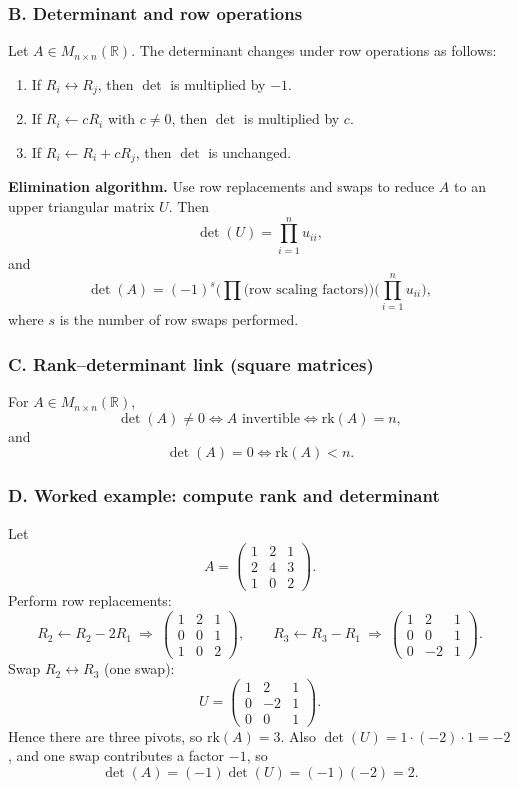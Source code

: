 \documentclass[12pt,a4paper]{article}
\theoremstyle{plain}
\theoremstyle{definition}      %
\begin{document}
\subsubsection*{B. Determinant and row operations}

Let $A\in M_{n\times n}(\mathbb R)$. The determinant changes under row operations as follows:
\begin{enumerate}
	\item If $R_i\leftrightarrow R_j$, then $\det$ is multiplied by $-1$.
	\item If $R_i\leftarrow cR_i$ with $c\neq 0$, then $\det$ is multiplied by $c$.
	\item If $R_i\leftarrow R_i+cR_j$, then $\det$ is unchanged.
\end{enumerate}

\medskip
\noindent\textbf{Elimination algorithm.}
Use row replacements and swaps to reduce $A$ to an upper triangular matrix $U$.
Then
\[
\det(U)=\prod_{i=1}^n u_{ii},
\]
and
\[
\det(A)=(-1)^{s}\Big(\prod \text{(row scaling factors)}\Big)\Big(\prod_{i=1}^n u_{ii}\Big),
\]
where $s$ is the number of row swaps performed.

\subsubsection*{C. Rank--determinant link (square matrices)}

For $A\in M_{n\times n}(\mathbb R)$,
\[
\det(A)\neq 0 \iff A \text{ invertible} \iff \mathrm{rk}(A)=n,
\]
and
\[
\det(A)=0 \iff \mathrm{rk}(A)<n.
\]

\subsubsection*{D. Worked example: compute rank and determinant}

Let
\[
A=\begin{pmatrix}
	1&2&1\\
	2&4&3\\
	1&0&2
\end{pmatrix}.
\]
Perform row replacements:
\[
R_2\leftarrow R_2-2R_1\ \Rightarrow\
\begin{pmatrix}
	1&2&1\\
	0&0&1\\
	1&0&2
\end{pmatrix},
\qquad
R_3\leftarrow R_3-R_1\ \Rightarrow\
\begin{pmatrix}
	1&2&1\\
	0&0&1\\
	0&-2&1
\end{pmatrix}.
\]
Swap $R_2\leftrightarrow R_3$ (one swap):
\[
U=\begin{pmatrix}
	1&2&1\\
	0&-2&1\\
	0&0&1
\end{pmatrix}.
\]
Hence there are three pivots, so $\mathrm{rk}(A)=3$.
Also $\det(U)=1\cdot(-2)\cdot 1=-2$, and one swap contributes a factor $-1$, so
\[
\det(A)=(-1)\det(U)=(-1)(-2)=2.
\]
\end{document}

